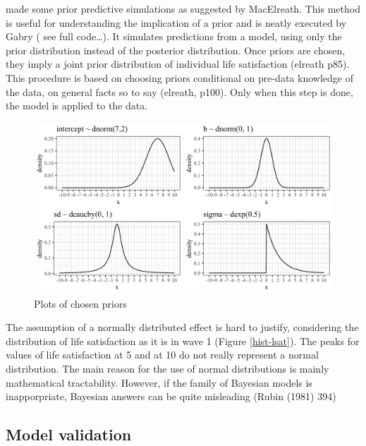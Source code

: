 \documentclass[a4, 12pt]{article}
\begin{document}
made some prior predictive simulations as suggested by MacElreath. This method is useful for understanding the implication of a prior and is neatly executed by Gabry ( see full code\ldots). It simulates predictions from a model, using only the prior distribution instead of the posterior distribution. Once priors are chosen, they imply a joint prior distribution of individual life satisfaction (elreath p85). This procedure is based on choosing priors conditional on pre-data knowledge of the data, on general facts so to say (elreath, p100). Only when this step is done, the model is applied to the data.

\begin{figure}

{\centering \includegraphics[width=0.8\linewidth]{../figures/plot_priors} 

}

\caption{Plots of chosen priors}\label{fig:chosen-priors}
\end{figure}

The assumption of a normally distributed effect is hard to justify, considering the distribution of life satisfaction as it is in wave 1 (Figure \ref{hist-lsat}). The peaks for values of life satisfaction at 5 and at 10 do not really represent a normal distribution. The main reason for the use of normal distributions is mainly mathematical tractability. However, if the family of Bayesian models is inapporpriate, Bayesian answers can be quite misleading (Rubin (1981) 394)

\hypertarget{model-validation}{%
\subsection{Model validation}\label{model-validation}}
\end{document}
